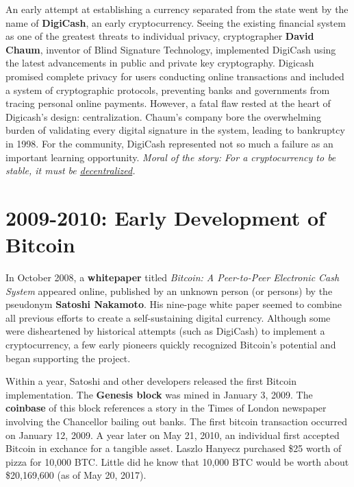 \documentclass[11pt]{article}
\begin{document}
    An early attempt at establishing a currency separated from the state went by the name of \textbf{DigiCash}, an early cryptocurrency. Seeing the existing financial system as one of the greatest threats to individual privacy, cryptographer \textbf{David Chaum}, inventor of Blind Signature Technology, implemented DigiCash using the latest advancements in public and private key cryptography. Digicash promised complete privacy for users conducting online transactions and included a system of cryptographic protocols, preventing banks and governments from tracing personal online payments. However, a fatal flaw rested at the heart of Digicash's design: centralization. Chaum's company bore the overwhelming burden of validating every digital signature in the system, leading to bankruptcy in 1998. For the community, DigiCash represented not so much a failure as an important learning opportunity. \textit{Moral of the story: For a cryptocurrency to be stable, it must be \underline{decentralized}.}
    
    \section*{2009-2010: Early Development of Bitcoin}
    
    In October 2008, a \textbf{whitepaper} titled \textit{Bitcoin: A Peer-to-Peer Electronic Cash System} appeared online, published by an unknown person (or persons) by the pseudonym \textbf{Satoshi Nakamoto}. His nine-page white paper seemed to combine all previous efforts to create a self-sustaining digital currency. Although some were disheartened by historical attempts (such as DigiCash) to implement a cryptocurrency, a few early pioneers quickly recognized Bitcoin's potential and began supporting the project.
    
    Within a year, Satoshi and other developers released the first Bitcoin implementation. The \textbf{Genesis block} was mined in January 3, 2009. The \textbf{coinbase} of this block references a story in the Times of London newspaper involving the Chancellor bailing out banks. The first bitcoin transaction occurred on January 12, 2009. A year later on May 21, 2010, an individual first accepted Bitcoin in exchance for a tangible asset. Laszlo Hanyecz purchased \$25 worth of pizza for 10,000 BTC. Little did he know that 10,000 BTC would be worth about \$20,169,600 (as of May 20, 2017).
\end{document}
